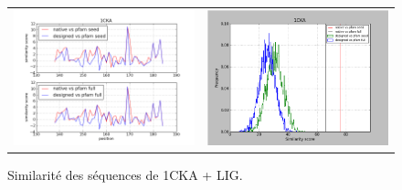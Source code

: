 \documentclass[a4paper,12pt]{article}
\begin{document}
   \begin{figure}[t]
     \centering
     \begin{tabular}{cc}
       \includegraphics[width=8.45cm]{sedano_gen4/graph_simil_bypos.png} &
       \includegraphics[width=8.45cm]{sedano_gen4/graph_simil_byseq.png} \\

     \end{tabular}

     \caption{Similarité des séquences de 1CKA + LIG.}

   \end{figure}
\end{document}
